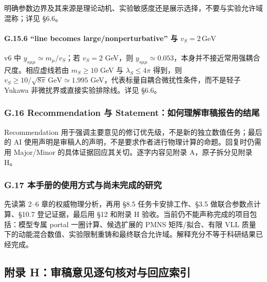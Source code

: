 \documentclass[
  chinese,
  UTF8]{ctexart}
\begin{document}
明确参数边界及其来源是理论动机、实验敏感度还是展示选择，不要与实验允许域混称；详见
§6.6。

\paragraph{\texorpdfstring{G.15.6 ``line becomes large/nonperturbative''
与
\(v_S=2\,\mathrm{GeV}\)}{G.15.6 ``line becomes large/nonperturbative'' 与 v\_S=2\textbackslash,\textbackslash mathrm\{GeV\}}}\label{g.15.6-line-becomes-largenonperturbative-ux4e0e-v_s2mathrmgev}

v6 中 \(y_{s\mu\mu}\simeq m_\mu/v_S\)；若 \(v_S=2\) GeV，则
\(y_{s\mu\mu}\simeq0.053\)，本身并不接近常用强耦合尺度。相应虚线若由
\(m_S\geq10\) GeV 与 \(\lambda_S\leq4\pi\) 得到，则
\(v_S\geq10/\sqrt{8\pi}\,\mathrm{GeV}\simeq1.995\)
GeV，代表标量自耦合微扰性条件，而不是轻子 Yukawa
非微扰界或直接实验排除线。详见 §6.6。

\subsubsection{G.16 Recommendation 与
Statement：如何理解审稿报告的结尾}\label{g.16-recommendation-ux4e0e-statementux5982ux4f55ux7406ux89e3ux5ba1ux7a3fux62a5ux544aux7684ux7ed3ux5c3e}

Recommendation
用于强调主要意见的修订优先级，不是新的独立数值任务；最后的 AI
使用声明是审稿人的声明，不是要求作者进行物理计算的命题。回复时仍需用
Major/Minor 的具体证据回应其关切。逐字内容见附录 A，原子拆分见附录 H。

\subsubsection{G.17
本手册的使用方式与尚未完成的研究}\label{g.17-ux672cux624bux518cux7684ux4f7fux7528ux65b9ux5f0fux4e0eux5c1aux672aux5b8cux6210ux7684ux7814ux7a76}

先读第 2--6 章的权威物理分析，再用 §8.5 任务卡安排工作、§3.5
做联合参数点计算、§10.7 登记证据，最后用 §12 和附录 H
验收。当前仍不能声称完成的项目包括：模型专属 portal 一圈计算、候选扩展的
PMNS 矩阵/拟合、有限 VLL
质量下的动能混合数值、实验限制重铸和最终联合允许域。解释充分不等于科研结果已经完成。

\subsection{附录
H：审稿意见逐句核对与回应索引}\label{ux9644ux5f55-hux5ba1ux7a3fux610fux89c1ux9010ux53e5ux6838ux5bf9ux4e0eux56deux5e94ux7d22ux5f15}
\end{document}
